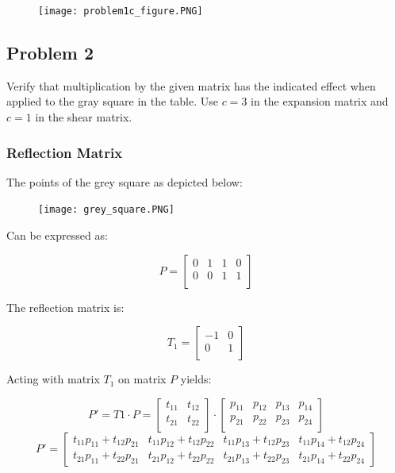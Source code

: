\documentclass{article}
\begin{document}
\begin{figure}[!htb]
  \centering
  \texttt{[image: problem1c\_figure.PNG]}
  \label{fig3}
\end{figure}


\subsection*{Problem 2}

Verify that multiplication by the given matrix has the indicated effect when applied to the gray square in the
table. Use $c=3$ in the expansion matrix and $c=1$ in the shear matrix.

\subsubsection*{Reflection Matrix}

The points of the grey square as depicted below:

\begin{figure}[!htb]
  \centering
  \texttt{[image: grey\_square.PNG]}
  \label{fig3}
\end{figure}

Can be expressed as:

\[P = 
\begin{bmatrix}
    0 & 1 & 1 & 0 \\
    0 & 0 & 1 & 1 \\
\end{bmatrix}
\]

The reflection matrix is:

\[T_{1} = 
\begin{bmatrix}
    -1 & 0  \\
    0 & 1  \\
\end{bmatrix}
\]

Acting with matrix $T_1$ on matrix $P$ yields:

\[ 
P' = T1 \cdot P = \begin{bmatrix}
t_{11} & t_{12} \\
t_{21} & t_{22} \\
\end{bmatrix} \cdot \begin{bmatrix}
p_{11} & p_{12} & p_{13} & p_{14} \\
p_{21} & p_{22} & p_{23} & p_{24} \\
\end{bmatrix}
\]
\[P' =  
\begin{bmatrix}
    t_{11}p_{11} + t_{12}p_{21} & t_{11}p_{12} + t_{12}p_{22} & t_{11}p_{13} + t_{12}p_{23} & t_{11}p_{14} + t_{12}p_{24} \\
    t_{21}p_{11} + t_{22}p_{21} & t_{21}p_{12} + t_{22}p_{22} & t_{21}p_{13} + t_{22}p_{23} & t_{21}p_{14} + t_{22}p_{24}
\end{bmatrix}
\]
\end{document}
